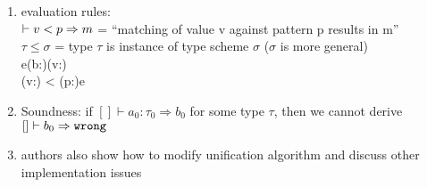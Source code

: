 \documentclass[12pt]{article}	%
\begin{document}
\begin{enumerate}
	\item evaluation rules:\\
	$\vdash v < p \Rightarrow m$ = ``matching of value v against pattern p results in m'' \\
	$\tau \leq \sigma$ = type $\tau$ is instance of type scheme $\sigma$ ($\sigma$ is more general) \\
	          {e\vdash \dynamic(b:\sigma)\eval \dynamic(v:\sigma)} \\
	          {\vdash \dynamic(v:\sigma) < \dynamic(p:\tau)\eval e}
	
	\item Soundness: if $[]\vdash a_0:\tau_0 \Rightarrow b_0$ for some type $\tau$, then we cannot derive $[]\vdash b_0 \Rightarrow \mathtt{wrong}$
	\item authors also show how to modify unification algorithm and discuss other implementation issues
\end{enumerate}
\end{document}
